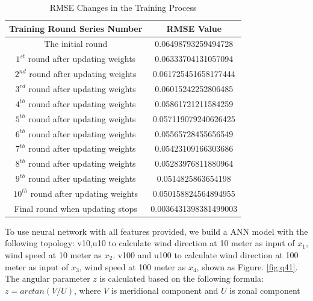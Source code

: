 \documentclass[a4paper, article, oneside, USenglish, IN5460]{memoir}
\begin{document}
{\begin{table}[htbp] %
    \centering %
    \caption{RMSE Changes in the Training Process } %
    \label{tab:example} %
    \begin{tabular}{|c|c|} %
        \hline %
        Training Round Series Number & RMSE Value \\ %
        \hline %
        The initial round & 0.06498793259494728 \\ %
        $1^{st}$ round after updating weights & 0.06333704131057094 \\ %
        $2^{nd}$ round after updating weights &  0.061725451658177444 \\ %
        $3^{rd}$ round after updating weights & 0.06015242252806485 \\ %
        $4^{th}$ round after updating weights & 0.05861721211584259 \\ %
        $5^{th}$ round after updating weights & 0.057119079240626425 \\ %
        $6^{th}$ round after updating weights & 0.05565728455656549 \\ %
        $7^{th}$ round after updating weights & 0.05423109166303686 \\ %
        $8^{th}$ round after updating weights &  0.05283976811880964 \\ %
        $9^{th}$ round after updating weights & 0.0514825863654198\\ %
        $10^{th}$ round after updating weights & 0.050158824564894955 \\ %
        Final round when updating stops & 0.0036431398381499003 \\ %
        
        
        \hline %
    \end{tabular}
\end{table}

To use neural network with all features provided, we build a ANN model with the following topology: v10,u10 to calculate wind direction at 10 meter as input of $x_1$, wind speed at 10 meter as $x_2$. v100 and u100 to calculate wind direction at 100 meter as input of $x_3$,  wind speed at 100 meter as $x_4$, shown as Figure. \ref{fig:q41}.
The angular parameter $z$ is calculated based on the following formula: 
$z = arctan(V/U)$, where  
$V$ is  meridional component and $U$ is zonal component

}
\end{document}

